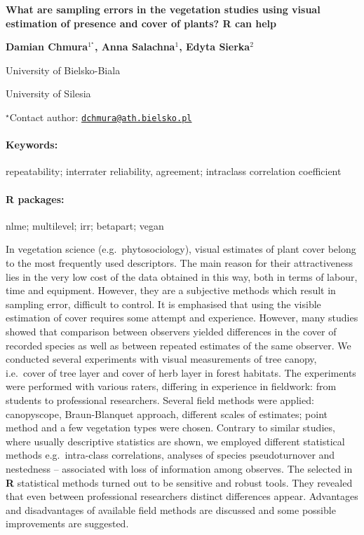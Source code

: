 \documentclass[11pt, a4paper]{article}
\renewcommand{\title}[1]{\begin{center}{\bf \LARGE #1}\end{center}}
\newcommand{\keywords}{\paragraph{Keywords:}}
\newcommand{\packages}{\paragraph{R packages:}}
\begin{document}
\pagestyle{empty}

\title{What are sampling errors in the vegetation studies using visual
estimation of presence and cover of plants? R can help}

\begin{center}
  {\bf Damian Chmura$^{1^\star}$, Anna Salachna$^{1}$, Edyta Sierka$^{2}$}
\end{center}

\vskip 0.3cm

\begin{affiliations}
\begin{enumerate}
\begin{minipage}{0.915\textwidth}
\centering
\item University of Bielsko-Biala \\[-2pt]
\item University of Silesia \\[-2pt]
\end{minipage}
\end{enumerate}
$^\star$Contact author: \href{mailto:dchmura@ath.bielsko.pl}{\nolinkurl{dchmura@ath.bielsko.pl}}\\
\end{affiliations}

\vskip 0.5cm

\begin{minipage}{0.915\textwidth}
\keywords repeatability; interrater reliability, agreement; intraclass correlation
coefficient
\packages nlme; multilevel; irr; betapart; vegan
\end{minipage}

\vskip 0.8cm

In vegetation science (e.g.~phytosociology), visual estimates of plant
cover belong to the most frequently used descriptors. The main reason
for their attractiveness lies in the very low cost of the data obtained
in this way, both in terms of labour, time and equipment. However, they
are a subjective methods which result in sampling error, difficult to
control. It is emphasised that using the visible estimation of cover
requires some attempt and experience. However, many studies showed that
comparison between observers yielded differences in the cover of
recorded species as well as between repeated estimates of the same
observer. We conducted several experiments with visual measurements of
tree canopy, i.e.~cover of tree layer and cover of herb layer in forest
habitats. The experiments were performed with various raters, differing
in experience in fieldwork: from students to professional researchers.
Several field methods were applied: canopyscope, Braun-Blanquet
approach, different scales of estimates; point method and a few
vegetation types were chosen. Contrary to similar studies, where usually
descriptive statistics are shown, we employed different statistical
methods e.g.~intra-class correlations, analyses of species
pseudoturnover and nestedness -- associated with loss of information
among observes. The selected in \textbf{R} statistical methods turned
out to be sensitive and robust tools. They revealed that even between
professional researchers distinct differences appear. Advantages and
disadvantages of available field methods are discussed and some possible
improvements are suggested.
\end{document}
